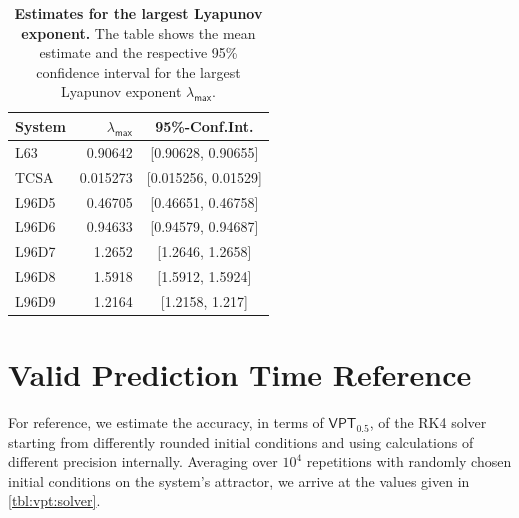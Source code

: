 \documentclass{article}
\newcommand{\vpt}[1]{\mathsf{VPT}_{#1}}
\begin{document}
\begin{table}[b!]
\begin{center}
\fontsize{8.0pt}{10pt}\selectfont
{}\selectfont
\renewcommand{\arraystretch}{1.05}
\setlength{\tabcolsep}{0.5em}
\begin{tabular}{lrc}
\toprule
System & $\lambda_{\mathsf{max}}$ & 95\%-Conf.Int. \\ 
\midrule\addlinespace[2.5pt]
L63 & 0.90642 & [0.90628, 0.90655] \\ 
TCSA & 0.015273 & [0.015256, 0.01529] \\ 
L96D5 & 0.46705 & [0.46651, 0.46758] \\ 
L96D6 & 0.94633 & [0.94579, 0.94687] \\ 
L96D7 & 1.2652 & [1.2646, 1.2658] \\ 
L96D8 & 1.5918 & [1.5912, 1.5924] \\ 
L96D9 & 1.2164 & [1.2158, 1.217] \\ 
\bottomrule
\end{tabular}
\end{center}


	\caption{\textbf{Estimates for the largest Lyapunov exponent.} The table shows the mean estimate and the respective 95\% confidence interval for the largest Lyapunov exponent $\lambda_{\mathsf{max}}$.}
	\label{tbl:lyapunov}
\end{table}

\clearpage
\section{Valid Prediction Time Reference}\label{app:sec:vptref}
%
For reference, we estimate the accuracy, in terms of $\vpt{0.5}$, of the RK4 solver starting from differently rounded initial conditions and using calculations of different precision internally. Averaging over $10^4$ repetitions with randomly chosen initial conditions on the system's attractor, we arrive at the values given in \cref{tbl:vpt:solver}.
\end{document}
